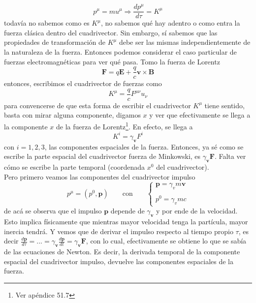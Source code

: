 \begin{equation*}
    p^{\mu} = m u^{\mu}
    \Longrightarrow \frac{dp^{\mu}}{d\tau} = K^{\mu}
\end{equation*}
todavía no sabemos como es $K^{\mu}$, no sabemos qué hay adentro o como entra la fuerza clásica dentro del cuadrivector. Sin embargo, sí sabemos que las propiedades de transformación de $K^{\mu}$ debe ser las mismas independientemente de la naturaleza de la fuerza. Entonces podemos considerar el caso particular de fuerzas electromagnéticas para ver qué pasa. Tomo la fuerza de Lorentz
\begin{equation*}
    \textbf{F} =
    q \textbf{E} + \frac{q}{c} \textbf{v}\times \textbf{B}
\end{equation*}
entonces, escribimos el cuadrivector de fuerzas como
\begin{equation*}
    K^{\mu} = \frac{q}{c} F^{\mu\nu}u_{\nu}
\end{equation*}
para convencerse de que esta forma de escribir el cuadrivector $K^{\mu}$ tiene sentido, basta con mirar alguna componente, digamos $x$ y ver que efectivamente se llega a la componente $x$ de la fuerza de Lorentz\footnote{Ver apéndice 51.7}. En efecto, se llega a 
\begin{equation*}
    K^{i} = \gamma_{\textbf{v}}F^{i}
\end{equation*}
con $i = 1,2,3$, las componentes espaciales de la fuerza. Entonces, ya sé como se escribe la parte espacial del cuadrivector fuerza de Minkowski, es $\gamma_{\textbf{v}}\textbf{F}$. Falta ver cómo se escribe la parte temporal (coordenada $x^{0}$ del cuadrivector).\\
\indent Pero primero veamos las componentes del cuadrivector impulso
\begin{equation*}
    p^{\mu} = (p^{0}, \textbf{p})
    \quad
    \quad
    \mbox{con}
    \quad
    \quad
    \left\{
        \begin{matrix}
            \textbf{p} = \gamma_{v} m \textbf{v}\\
            \\
            p^{0} = \gamma_{v} m c
        \end{matrix}
    \right.
\end{equation*}
de acá se observa que el impulso $\textbf{p}$ depende de $\gamma_{\textbf{v}}$ y por ende de la velocidad. Esto implica físicamente que mientras mayor velocidad tenga la partícula, mayor inercia tendrá. Y vemos que de derivar el impulso respecto al tiempo propio $\tau$, es decir $\frac{d\textbf{p}}{d\tau} = ... = \gamma_{\textbf{v}}\frac{d\textbf{p}}{dt} = \gamma_{\textbf{v}}\textbf{F}$, con lo cual, efectivamente se obtiene lo que se sabía de las ecuaciones de Newton. Es decir, la derivada temporal de la componente espacial del cuadrivector impulso, devuelve las componentes espaciales de la fuerza.
